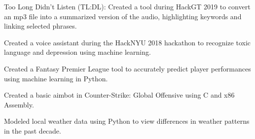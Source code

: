 \begin{cventries}
{\begin{cvitems}
        \item {Too Long Didn't Listen (TL:DL): Created a tool during HackGT 2019 to convert an mp3 file into a summarized version of the audio, highlighting keywords and linking selected phrases.}
            \vspace{1mm}
        \item {Created a voice assistant during the HackNYU 2018 hackathon to recognize toxic language and depression using machine learning.}
            \vspace{1mm}
        \item {Created a Fantasy Premier League tool to accurately predict player performances using machine learning in Python.}
             \vspace{1mm}
        \item {Created a basic aimbot in Counter-Strike: Global Offensive using C and x86 Assembly.}
            \vspace{1mm}
        \item {Modeled local weather data using Python to view differences in weather patterns in the past decade.}
            \vspace{1mm}
      \end{cvitems}
    }

\end{cventries}
